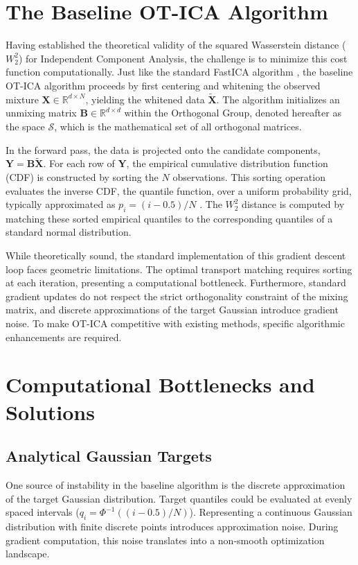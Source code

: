 \documentclass[12pt,a4paper,twoside,openany]{book}
\begin{document}
\section{The Baseline OT-ICA Algorithm}
Having established the theoretical validity of the squared Wasserstein distance ($W_2^2$) for Independent Component Analysis, 
the challenge is to minimize this cost function computationally. Just like the standard FastICA algorithm \cite{hyvarinen2001}, 
the baseline OT-ICA algorithm proceeds by first centering and whitening 
the observed mixture $\mathbf{X} \in \mathbb{R}^{d \times N}$, yielding the whitened data $\widetilde{\mathbf{X}}$. The algorithm initializes 
an unmixing matrix $\mathbf{B} \in \mathbb{R}^{d \times d}$ within the Orthogonal Group, denoted hereafter as the space $\mathcal{S}$, which is the mathematical set of all orthogonal matrices. 

In the forward pass, the data is projected onto the candidate components, $\mathbf{Y} = \mathbf{B}\widetilde{\mathbf{X}}$. For each row of $\mathbf{Y}$, 
the empirical cumulative distribution function (CDF) is constructed by sorting the $N$ observations. This sorting operation evaluates the inverse CDF, the quantile function, 
over a uniform probability grid, typically approximated as $p_i = (i - 0.5)/N$ \cite[Chapter 2]{villani2003}. The $W_2^2$ distance is computed by matching these sorted 
empirical quantiles to the corresponding quantiles of a standard normal distribution. 

While theoretically sound, the standard implementation of this gradient descent loop faces geometric limitations. 
The optimal transport matching requires sorting at each iteration, presenting a computational bottleneck. 
Furthermore, standard gradient updates do not respect the strict orthogonality constraint of the mixing matrix, 
and discrete approximations of the target Gaussian introduce gradient noise. To make OT-ICA competitive with existing methods, 
specific algorithmic enhancements are required.

\section{Computational Bottlenecks and Solutions}

\subsection{Analytical Gaussian Targets}
One source of instability in the baseline algorithm is the discrete approximation of the target Gaussian distribution. 
Target quantiles could be evaluated at evenly spaced intervals ($q_i = \Phi^{-1}((i - 0.5)/N)$). Representing a continuous 
Gaussian distribution with finite discrete points 
introduces approximation noise. During gradient computation, this noise translates into a non-smooth optimization landscape.
\end{document}
